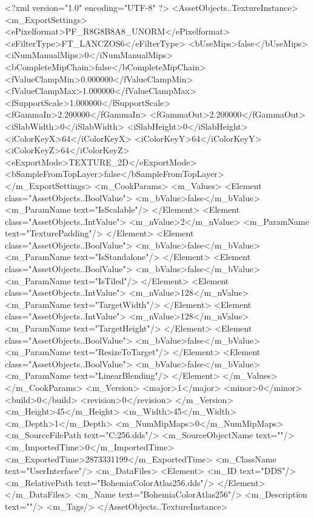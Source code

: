 <?xml version="1.0" encoding="UTF-8" ?>
<AssetObjects..TextureInstance>
	<m_ExportSettings>
		<ePixelformat>PF_R8G8B8A8_UNORM</ePixelformat>
		<eFilterType>FT_LANCZOS6</eFilterType>
		<bUseMips>false</bUseMips>
		<iNumManualMips>0</iNumManualMips>
		<bCompleteMipChain>false</bCompleteMipChain>
		<fValueClampMin>0.000000</fValueClampMin>
		<fValueClampMax>1.000000</fValueClampMax>
		<fSupportScale>1.000000</fSupportScale>
		<fGammaIn>2.200000</fGammaIn>
		<fGammaOut>2.200000</fGammaOut>
		<iSlabWidth>0</iSlabWidth>
		<iSlabHeight>0</iSlabHeight>
		<iColorKeyX>64</iColorKeyX>
		<iColorKeyY>64</iColorKeyY>
		<iColorKeyZ>64</iColorKeyZ>
		<eExportMode>TEXTURE_2D</eExportMode>
		<bSampleFromTopLayer>false</bSampleFromTopLayer>
	</m_ExportSettings>
	<m_CookParams>
		<m_Values>
			<Element class="AssetObjects..BoolValue">
				<m_bValue>false</m_bValue>
				<m_ParamName text="IsScalable"/>
			</Element>
			<Element class="AssetObjects..IntValue">
				<m_nValue>2</m_nValue>
				<m_ParamName text="TexturePadding"/>
			</Element>
			<Element class="AssetObjects..BoolValue">
				<m_bValue>false</m_bValue>
				<m_ParamName text="IsStandalone"/>
			</Element>
			<Element class="AssetObjects..BoolValue">
				<m_bValue>false</m_bValue>
				<m_ParamName text="IsTiled"/>
			</Element>
			<Element class="AssetObjects..IntValue">
				<m_nValue>128</m_nValue>
				<m_ParamName text="TargetWidth"/>
			</Element>
			<Element class="AssetObjects..IntValue">
				<m_nValue>128</m_nValue>
				<m_ParamName text="TargetHeight"/>
			</Element>
			<Element class="AssetObjects..BoolValue">
				<m_bValue>false</m_bValue>
				<m_ParamName text="ResizeToTarget"/>
			</Element>
			<Element class="AssetObjects..BoolValue">
				<m_bValue>false</m_bValue>
				<m_ParamName text="LinearBlending"/>
			</Element>
		</m_Values>
	</m_CookParams>
	<m_Version>
		<major>1</major>
		<minor>0</minor>
		<build>0</build>
		<revision>0</revision>
	</m_Version>
	<m_Height>45</m_Height>
	<m_Width>45</m_Width>
	<m_Depth>1</m_Depth>
	<m_NumMipMaps>0</m_NumMipMaps>
	<m_SourceFilePath text="C:\Users\aaron\Downloads\bohemiaicons\BohemiaColorAtlas256.dds"/>
	<m_SourceObjectName text=""/>
	<m_ImportedTime>0</m_ImportedTime>
	<m_ExportedTime>2873331199</m_ExportedTime>
	<m_ClassName text="UserInterface"/>
	<m_DataFiles>
		<Element>
			<m_ID text="DDS"/>
			<m_RelativePath text="BohemiaColorAtlas256.dds"/>
		</Element>
	</m_DataFiles>
	<m_Name text="BohemiaColorAtlas256"/>
	<m_Description text=""/>
	<m_Tags/>
</AssetObjects..TextureInstance>

